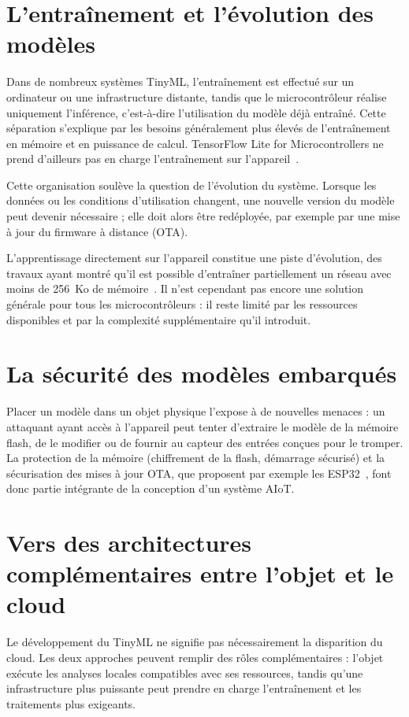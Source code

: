 \section{L'entraînement et l'évolution des modèles}

Dans de nombreux systèmes TinyML, l'entraînement est effectué sur un ordinateur
ou une infrastructure distante, tandis que le microcontrôleur réalise uniquement
l'inférence, c'est-à-dire l'utilisation du modèle déjà entraîné. Cette
séparation s'explique par les besoins généralement plus élevés de
l'entraînement en mémoire et en puissance de calcul. TensorFlow Lite for
Microcontrollers ne prend d'ailleurs pas en charge l'entraînement sur
l'appareil~\cite{tflm-doc}.

Cette organisation soulève la question de l'évolution du système. Lorsque les
données ou les conditions d'utilisation changent, une nouvelle version du modèle
peut devenir nécessaire ; elle doit alors être redéployée, par exemple par une
mise à jour du firmware à distance (OTA).

L'apprentissage directement sur l'appareil constitue une piste d'évolution, des
travaux ayant montré qu'il est possible d'entraîner partiellement un réseau
avec moins de 256~Ko de mémoire~\cite{lin2022ondevice}. Il n'est cependant pas
encore une solution générale pour tous les microcontrôleurs : il reste limité
par les ressources disponibles et par la complexité supplémentaire qu'il
introduit.

\section{La sécurité des modèles embarqués}

Placer un modèle dans un objet physique l'expose à de nouvelles menaces : un
attaquant ayant accès à l'appareil peut tenter d'extraire le modèle de la
mémoire flash, de le modifier ou de fournir au capteur des entrées conçues pour
le tromper. La protection de la mémoire (chiffrement de la flash, démarrage
sécurisé) et la sécurisation des mises à jour OTA, que proposent par exemple
les ESP32~\cite{espressif-esp32}, font donc partie intégrante de la conception
d'un système AIoT.

\section{Vers des architectures complémentaires entre l'objet et le cloud}

Le développement du TinyML ne signifie pas nécessairement la disparition du
cloud. Les deux approches peuvent remplir des rôles complémentaires : l'objet
exécute les analyses locales compatibles avec ses ressources, tandis qu'une
infrastructure plus puissante peut prendre en charge l'entraînement et les
traitements plus exigeants.

